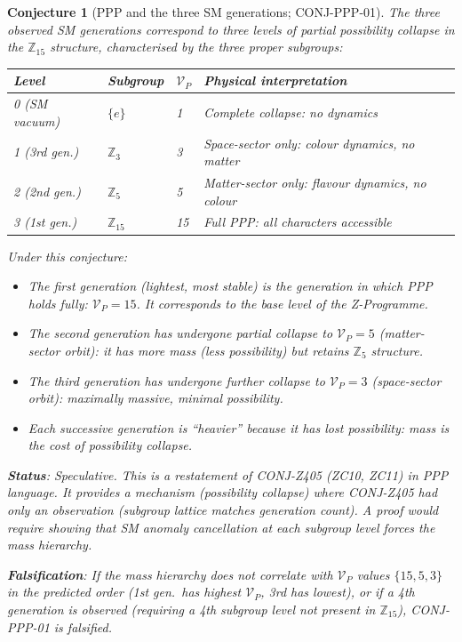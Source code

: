 \documentclass[12pt, a4paper]{article}
\newtheorem{conjecture}{Conjecture}[section]
\begin{document}
\begin{conjecture}[PPP and the three SM generations; CONJ-PPP-01]
\label{conj:generations}
The three observed SM generations correspond to three levels of
\emph{partial possibility collapse} in the $\mathbb{Z}_{15}$
structure, characterised by the three proper subgroups:

{\small
\renewcommand{\arraystretch}{1.30}
\begin{tabular}{p{2.0cm} p{3.5cm} p{2.5cm} p{5.0cm}}
\toprule
\textbf{Level} & \textbf{Subgroup} & \textbf{$\mathcal{V}_P$} &
\textbf{Physical interpretation} \\
\midrule
0 (SM vacuum) & $\{e\}$ & 1 & Complete collapse: no dynamics \\
1 (3rd gen.)  & $\mathbb{Z}_3$ & 3
  & Space-sector only: colour dynamics, no matter \\
2 (2nd gen.)  & $\mathbb{Z}_5$ & 5
  & Matter-sector only: flavour dynamics, no colour \\
3 (1st gen.)  & $\mathbb{Z}_{15}$ & 15
  & Full PPP: all characters accessible \\
\bottomrule
\end{tabular}
}

\medskip
Under this conjecture:
\begin{itemize}[leftmargin=*, noitemsep]
  \item The \emph{first generation} (lightest, most stable) is the
    generation in which PPP holds fully: $\mathcal{V}_P = 15$.
    It corresponds to the base level of the Z-Programme.
  \item The \emph{second generation} has undergone partial collapse
    to $\mathcal{V}_P = 5$ (matter-sector orbit): it has more
    mass (less possibility) but retains $\mathbb{Z}_5$ structure.
  \item The \emph{third generation} has undergone further collapse
    to $\mathcal{V}_P = 3$ (space-sector orbit): maximally massive,
    minimal possibility.
  \item Each successive generation is ``heavier'' because it has
    lost possibility: mass is the cost of possibility collapse.
\end{itemize}

\textbf{Status}: Speculative. This is a restatement of CONJ-Z405
(ZC10, ZC11) in PPP language. It provides a \emph{mechanism}
(possibility collapse) where CONJ-Z405 had only an observation
(subgroup lattice matches generation count). A proof would require
showing that SM anomaly cancellation at each subgroup level forces
the mass hierarchy.

\textbf{Falsification}: If the mass hierarchy does not correlate
with $\mathcal{V}_P$ values $\{15, 5, 3\}$ in the predicted order
(1st gen.\ has highest $\mathcal{V}_P$, 3rd has lowest), or if
a 4th generation is observed (requiring a 4th subgroup level not
present in $\mathbb{Z}_{15}$), CONJ-PPP-01 is falsified.
\end{conjecture}
\end{document}
